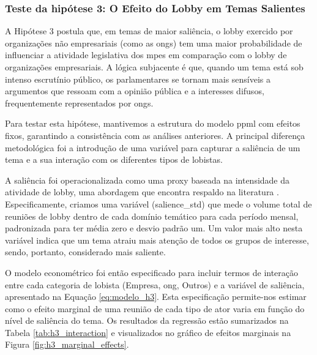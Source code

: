 \subsubsection{Teste da hipótese 3: O Efeito do Lobby em Temas Salientes}

A Hipótese 3 postula que, em temas de maior saliência, o lobby exercido por organizações não empresariais (como as \acrshort{ong}s) tem uma maior probabilidade de influenciar a atividade legislativa dos \acrshort{mpe}s em comparação com o lobby de organizações empresariais. A lógica subjacente é que, quando um tema está sob intenso escrutínio público, os parlamentares se tornam mais sensíveis a argumentos que ressoam com a opinião pública e a interesses difusos, frequentemente representados por \acrshort{ong}s.

Para testar esta hipótese, mantivemos a estrutura do modelo \acrshort{ppml} com efeitos fixos, garantindo a consistência com as análises anteriores. A principal diferença metodológica foi a introdução de uma variável para capturar a saliência de um tema e a sua interação com os diferentes tipos de lobistas.

A saliência foi operacionalizada como uma proxy baseada na intensidade da atividade de lobby, uma abordagem que encontra respaldo na literatura \cite{baumgartner2010agendas}. Especificamente, criamos uma variável (salience\_std) que mede o volume total de reuniões de lobby dentro de cada domínio temático para cada período mensal, padronizada para ter média zero e desvio padrão um. Um valor mais alto nesta variável indica que um tema atraiu mais atenção de todos os grupos de interesse, sendo, portanto, considerado mais saliente.

O modelo econométrico foi então especificado para incluir termos de interação entre cada categoria de lobista (Empresa, \acrshort{ong}, Outros) e a variável de saliência, apresentado na Equação \ref{eq:modelo_h3}. Esta especificação permite-nos estimar como o efeito marginal de uma reunião de cada tipo de ator varia em função do nível de saliência do tema. Os resultados da regressão estão sumarizados na Tabela \ref{tab:h3_interaction} e visualizados no gráfico de efeitos marginais na Figura \ref{fig:h3_marginal_effects}.




